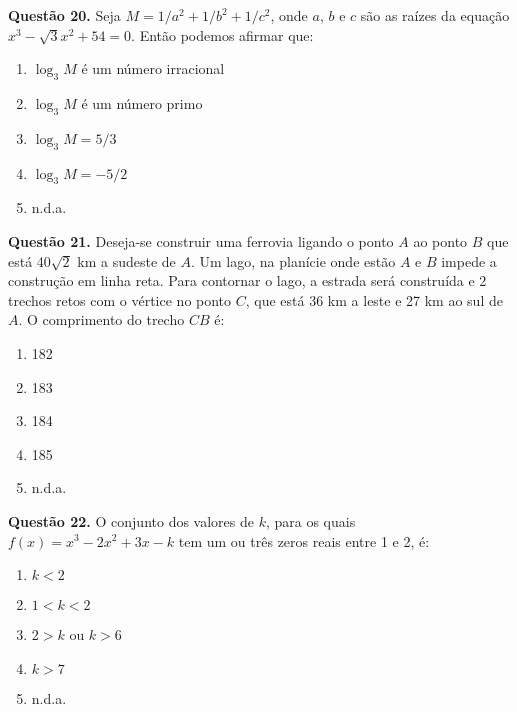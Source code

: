 \documentclass[11pt]{article}
\begin{document}
\textbf{Questão 20.} Seja $M = 1 / a^2 + 1 / b^2 + 1 / c^2$,  onde  $a$,  $b$  e  $c$  são  as  raízes  da  equação  $x^3 - \sqrt{3}x^2 + 54 =0$.  Então  podemos  afirmar que:

\begin{enumerate}[\bf A (\quad)]
    \item $\log_3 M$ é um número irracional
    \item $\log_3 M$ é um número primo 
    \item $\log_3 M = 5/3$
    \item $\log_3 M = -5/2$
    \item n.d.a.
\end{enumerate}

\textbf{Questão 21.} Deseja-se construir uma ferrovia ligando o ponto $A$ ao ponto $B$ que está 40$\sqrt{2}$ km a sudeste de $A$. Um lago, na planície  onde  estão  $A$  e  $B$  impede  a  construção  em  linha  reta.  Para  contornar  o  lago,  a  estrada  será  construída  e  2  trechos retos com o vértice no ponto $C$, que está 36 km a leste e 27 km ao sul de $A$. O comprimento do trecho $CB$ é:


\begin{multicols}{3}
    \begin{enumerate}[\bf A (\quad)]
        \item 182
        \item 183
        \item 184
        \item 185
        \item n.d.a.
    \end{enumerate}
\end{multicols}

\textbf{Questão 22.} O   conjunto   dos   valores   de   $k$,   para   os   quais $f(x) = x^3 - 2x^2 + 3x - k$ tem  um  ou  três  zeros  reais  entre 1 e 2, é: 

\begin{multicols}{3}
\begin{enumerate}[\bf A (\quad)]
    \item $k < 2$
    \item $1 < k < 2$
    \item $2 > k$ ou $k > 6$
    \item $k > 7$
    \item n.d.a.
\end{enumerate}
\end{multicols}

\newpage
\end{document}
